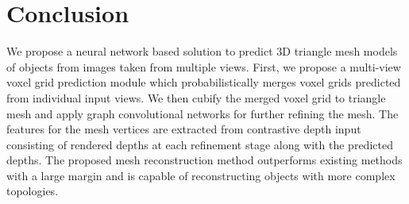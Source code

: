 \section{Conclusion}

We propose a neural network based solution to predict 3D triangle mesh models of objects from images taken from multiple views.
First, we propose a multi-view voxel grid prediction module which probabilistically merges voxel grids predicted from individual input views.
We then cubify the merged voxel grid to triangle mesh and apply graph convolutional networks for further refining the mesh.
The features for the mesh vertices are extracted from contrastive depth input consisting of rendered depths at each refinement stage along with the predicted depths.
The proposed mesh reconstruction method outperforms existing methods with a large margin and is capable of reconstructing objects with more complex topologies.

